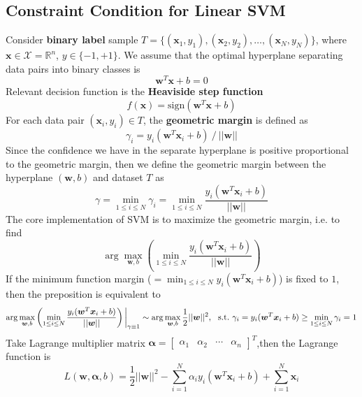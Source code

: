 \documentclass[12pt]{article}
\begin{document}
\subsection{Constraint Condition for Linear SVM}
Consider \textbf{binary label} sample $T= \{(\bm{x}_1, y_1), (\bm{x}_2, y_2), \dots, (\bm{x}_N, y_N)\}$, where $\bm{x} \in \mathcal{X} = \mathbb{R}^n$, $y \in \{-1, +1\}$. We assume that the optimal hyperplane separating data pairs into binary classes is
\begin{equation}
    \bm{w}^{T} \bm{x} + b = 0
\end{equation}
Relevant decision function is the \textbf{Heaviside step function}
\begin{equation}
    f(\bm{x}) = \text{sign} (\bm{w}^{T}\bm{x} + b)
\end{equation}
For each data pair $(\bm{x}_i, y_i)\in T$, the \textbf{geometric margin} is defined as
\begin{equation}
    \gamma_i = y_i(\bm{w}^T\bm{x}_i + b)~/~||\bm{w}||
\end{equation}
Since the confidence we have in the separate hyperplane is positive proportional to the geometric margin, then we define the geometric margin between the hyperplane $(\bm{w}, b)$ and dataset $T$ as
\begin{equation}
    \gamma = \min_{1\leq i \leq N} \gamma_i = \min_{1\leq i \leq N}\frac{y_i(\bm{w}^T\bm{x}_i + b)}{||\bm{w}||}
\end{equation}
The core implementation of SVM is to maximize the geometric margin, i.e. to find
\begin{equation}
    \arg \max_{\bm{w}, b} \left(\min_{1\leq i \leq N}\frac{y_i(\bm{w}^T\bm{x}_i + b)}{||\bm{w}||} \right)
\end{equation}
If the minimum function margin ($=\min_{1\leq i \leq N}y_i(\bm{w}^T\bm{x}_i + b)$) is fixed to $1$, then the preposition is equivalent to
\begin{equation}
    \arg \max_{\bm{w}, b} \left(\min_{1\leq i \leq N}\frac{y_i(\bm{w}^T\bm{x}_i + b)}{||\bm{w}||}\right) \bigg|_{\gamma \equiv 1} \sim \arg \max_{\bm{w}, b}  \frac{1}{2}||\bm{w}||^2,~~\text{s.t.}~\gamma_i = y_i(\bm{w}^T\bm{x}_i+b) \geq \min_{1 \leq i \leq N} \gamma_i = 1 \notag
\end{equation}
Take Lagrange multiplier matrix $\bm{\alpha} = \begin{bmatrix}
    \alpha_1 & \alpha_2 & \cdots & \alpha_n \end{bmatrix}^T$,then the Lagrange function is
\begin{equation}
    L(\bm{w}, \bm{\alpha}, b) = \frac{1}{2}||\bm{w}||^2 - \sum_{i=1}^N \alpha_i y_i (\bm{w}^T \bm{x}_i + b) + \sum_{i=1}^N \bm{x}_i
\end{equation}
\end{document}
